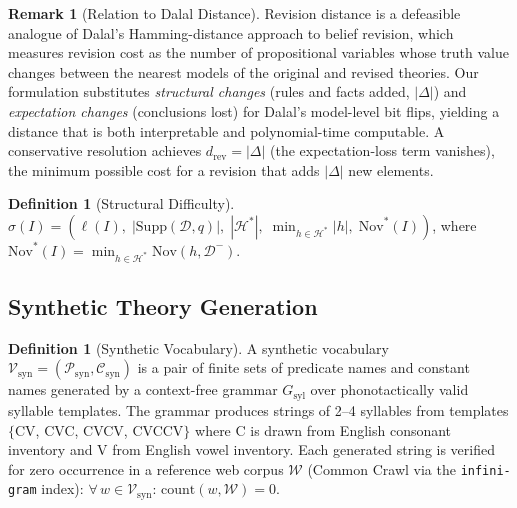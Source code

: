 \documentclass{article}
\theoremstyle{definition}
\newtheorem{definition}[theorem]{Definition}
\newtheorem{remark}[theorem]{Remark}
\newcommand{\D}{\mathcal{D}}
\newcommand{\Dm}{\mathcal{D}^{-}}
\newcommand{\Hgold}{\mathcal{H}^{*}}
\newcommand{\Supp}{\mathrm{Supp}}
\newcommand{\Nov}{\mathrm{Nov}}
\begin{document}
\begin{remark}[Relation to Dalal Distance]\label{rem:dalal}
Revision distance is a defeasible analogue of Dalal's \cite{dalal1988investigations} Hamming-distance approach to belief revision, which measures revision cost as the number of propositional variables whose truth value changes between the nearest models of the original and revised theories. Our formulation substitutes \emph{structural changes} (rules and facts added, $|\Delta|$) and \emph{expectation changes} (conclusions lost) for Dalal's model-level bit flips, yielding a distance that is both interpretable and polynomial-time computable. A conservative resolution achieves $d_{\mathrm{rev}} = |\Delta|$ (the expectation-loss term vanishes), the minimum possible cost for a revision that adds $|\Delta|$ new elements.
\end{remark}

\begin{definition}[Structural Difficulty]\label{def:structdiff}
$\sigma(I) = (\ell(I),\; |\Supp(\D, q)|,\; |\Hgold|,\; \min_{h \in \Hgold} |h|,\; \Nov^*(I))$, where $\Nov^*(I) = \min_{h \in \Hgold} \Nov(h, \Dm)$.
\end{definition}


\subsection{Synthetic Theory Generation}\label{subsec:synthetic_defs}

\begin{definition}[Synthetic Vocabulary]\label{def:synthvocab}
A synthetic vocabulary $\mathcal{V}_{\mathrm{syn}} = (\mathcal{P}_{\mathrm{syn}}, \mathcal{C}_{\mathrm{syn}})$ is a pair of finite sets of predicate names and constant names generated by a context-free grammar $G_{\mathrm{syl}}$ over phonotactically valid syllable templates. The grammar produces strings of 2--4 syllables from templates $\{$CV, CVC, CVCV, CVCCV$\}$ where C is drawn from English consonant inventory and V from English vowel inventory. Each generated string is verified for zero occurrence in a reference web corpus $\mathcal{W}$ (Common Crawl via the \texttt{infini-gram} index): $\forall\, w \in \mathcal{V}_{\mathrm{syn}}$: $\mathrm{count}(w, \mathcal{W}) = 0$.
\end{definition}
\end{document}
